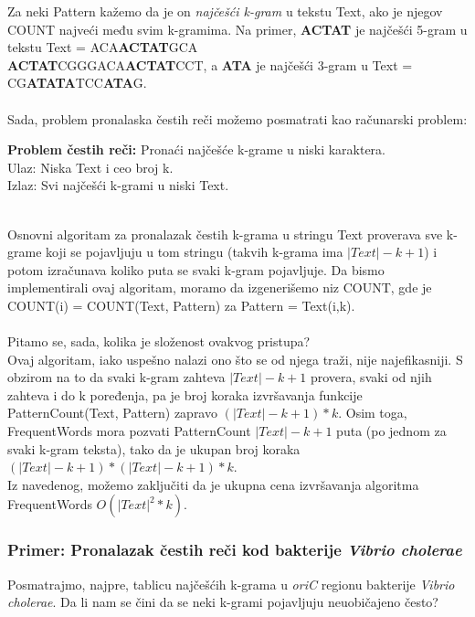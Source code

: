 Za neki Pattern kažemo da je on \textit{najčešći k-gram} u tekstu Text, ako je njegov COUNT najveći među svim k-gramima. Na primer, \textbf{ACTAT} je najčešći 5-gram u tekstu Text = ACA\textbf{ACTAT}GCA\\\textbf{ACTAT}CGGGACA\textbf{ACTAT}CCT, a \textbf{ATA} je najčešći 3-gram u Text = CG\textbf{ATATA}TCC\textbf{ATA}G.\\\\
Sada, problem pronalaska čestih reči možemo posmatrati kao računarski problem:\\
\begin{tcolorbox}
\textbf{Problem čestih reči:} Pronaći najčešće k-grame u niski karaktera.\\
Ulaz: Niska Text i ceo broj k.\\
Izlaz: Svi najčešći k-grami u niski Text. \\\\
\end{tcolorbox}
Osnovni algoritam za pronalazak čestih k-grama u stringu Text proverava sve k-grame koji se pojavljuju u tom stringu (takvih k-grama ima $|Text|-k+1$) i potom izračunava koliko puta se svaki k-gram pojavljuje. Da bismo implementirali ovaj algoritam, moramo da izgenerišemo niz COUNT, gde je COUNT(i) = COUNT(Text, Pattern) za Pattern = Text(i,k).\\\\

Pitamo se, sada, kolika je složenost ovakvog pristupa?\\
Ovaj algoritam, iako uspešno nalazi ono što se od njega traži, nije najefikasniji. S obzirom na to da svaki k-gram zahteva $|Text|-k+1$ provera, svaki od njih zahteva i do k poređenja, pa je broj koraka izvršavanja funkcije PatternCount(Text, Pattern) zapravo $(|Text|-k+1)*k$. Osim toga, FrequentWords mora pozvati PatternCount $|Text|-k+1$ puta (po jednom za svaki k-gram teksta), tako da je ukupan broj koraka \textit{$(|Text|-k+1)*(|Text|-k+1)*k$}.\\Iz navedenog, možemo zaključiti da je ukupna cena izvršavanja algoritma FrequentWords \textbf{$O(|Text|^2*k)$}.

\subsubsection{Primer: Pronalazak čestih reči kod bakterije \textit{Vibrio cholerae}} 

Posmatrajmo, najpre, tablicu najčešćih k-grama u \textit{oriC} regionu bakterije \textit{Vibrio cholerae}. Da li nam se čini da se neki k-grami pojavljuju neuobičajeno često? 

